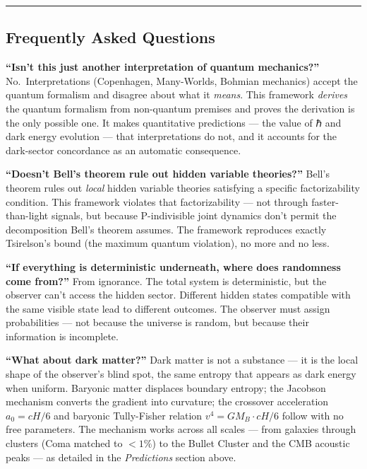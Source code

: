 \documentclass[
]{article}
\begin{document}
\begin{center}\rule{0.5\linewidth}{0.5pt}\end{center}

\hypertarget{frequently-asked-questions}{%
\subsection{Frequently Asked
Questions}\label{frequently-asked-questions}}

\textbf{``Isn't this just another interpretation of quantum
mechanics?''} No.~Interpretations (Copenhagen, Many-Worlds, Bohmian
mechanics) accept the quantum formalism and disagree about what it
\emph{means}. This framework \emph{derives} the quantum formalism from
non-quantum premises and proves the derivation is the only possible one.
It makes quantitative predictions --- the value of ℏ and dark energy
evolution --- that interpretations do not, and it accounts for the
dark-sector concordance as an automatic consequence.

\textbf{``Doesn't Bell's theorem rule out hidden variable theories?''}
Bell's theorem rules out \emph{local} hidden variable theories
satisfying a specific factorizability condition. This framework violates
that factorizability --- not through faster-than-light signals, but
because P-indivisible joint dynamics don't permit the decomposition
Bell's theorem assumes. The framework reproduces exactly Tsirelson's
bound (the maximum quantum violation), no more and no less.

\textbf{``If everything is deterministic underneath, where does
randomness come from?''} From ignorance. The total system is
deterministic, but the observer can't access the hidden sector.
Different hidden states compatible with the same visible state lead to
different outcomes. The observer must assign probabilities --- not
because the universe is random, but because their information is
incomplete.

\textbf{``What about dark matter?''} Dark matter is not a substance ---
it is the local shape of the observer's blind spot, the same entropy
that appears as dark energy when uniform. Baryonic matter displaces
boundary entropy; the Jacobson mechanism converts the gradient into
curvature; the crossover acceleration \(a_0 = cH/6\) and baryonic
Tully-Fisher relation \(v^4 = GM_B \cdot cH/6\) follow with no free
parameters. The mechanism works across all scales --- from galaxies
through clusters (Coma matched to \(< 1\%\)) to the Bullet Cluster and
the CMB acoustic peaks --- as detailed in the \emph{Predictions} section
above.
\end{document}
